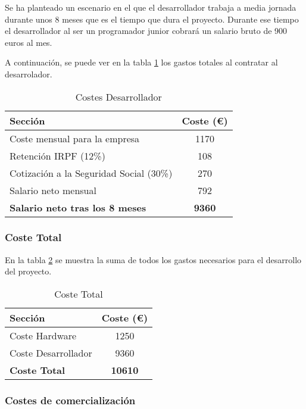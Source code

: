 Se ha planteado un escenario en el que el desarrollador trabaja a media jornada durante unos 8 meses que es el tiempo que dura el proyecto. Durante ese tiempo el desarrollador al ser un programador junior cobrará un salario bruto de 900 euros al mes.

A continuación, se puede ver en la tabla \ref{tab:CostosPersonal} los gastos totales al contratar al desarrolador.

\begin{table}[H]
\centering
\begin{tabular}{|l|c|}
\hline
\textbf{Sección} & \textbf{Coste (€)} \\ \hline
Coste mensual para la empresa & 1170 \\ \hline
Retención IRPF (12\%) & 108  \\ \hline
Cotización a la Seguridad Social (30\%) & 270 \\ \hline
Salario neto mensual & 792 \\ \hline
\textbf{Salario neto tras los 8 meses } & \textbf{9360} \\ \hline
\end{tabular}
\caption{Costes Desarrollador}
\label{tab:CostosPersonal}
\end{table}


\subsubsection{Coste Total}

En la tabla \ref{tab:CosteTotal} se muestra la suma de todos los gastos necesarios para el desarrollo del proyecto.


\begin{table}[H]
\centering
\begin{tabular}{|l|c|}
\hline
\textbf{Sección} & \textbf{Coste (€)} \\ \hline
Coste Hardware & 1250 \\ \hline
Coste Desarrollador & 9360 \\ \hline
\textbf{Coste Total} & \textbf{10610} \\ \hline
\end{tabular}
\caption{Coste Total}
\label{tab:CosteTotal}
\end{table}


\subsubsection{Costes de comercialización}

